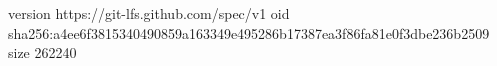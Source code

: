 version https://git-lfs.github.com/spec/v1
oid sha256:a4ee6f3815340490859a163349e495286b17387ea3f86fa81e0f3dbe236b2509
size 262240

